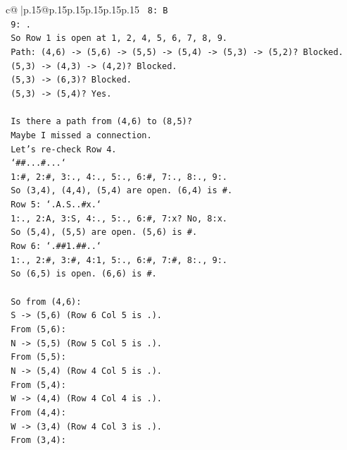 \documentclass{article}
\begin{document}
{\begin{supertabular}{c@{$\;$}|p{.15\linewidth}@{}p{.15\linewidth}p{.15\linewidth}p{.15\linewidth}p{.15\linewidth}p{.15\linewidth}}
{{{\texttt{   8: B} \\
\texttt{   9: .} \\
\texttt{   So Row 1 is open at 1, 2, 4, 5, 6, 7, 8, 9.} \\
\texttt{   Path: (4,6) {-}> (5,6) {-}> (5,5) {-}> (5,4) {-}> (5,3) {-}> (5,2)? Blocked.} \\
\texttt{   (5,3) {-}> (4,3) {-}> (4,2)? Blocked.} \\
\texttt{   (5,3) {-}> (6,3)? Blocked.} \\
\texttt{   (5,3) {-}> (5,4)? Yes.} \\
\\ 
\texttt{   Is there a path from (4,6) to (8,5)?} \\
\texttt{   Maybe I missed a connection.} \\
\texttt{   Let's re{-}check Row 4.} \\
\texttt{   `\#\#...\#...`} \\
\texttt{   1:\#, 2:\#, 3:., 4:., 5:., 6:\#, 7:., 8:., 9:.} \\
\texttt{   So (3,4), (4,4), (5,4) are open. (6,4) is \#.} \\
\texttt{   Row 5: `.A.S..\#x.`} \\
\texttt{   1:., 2:A, 3:S, 4:., 5:., 6:\#, 7:x? No, 8:x.} \\
\texttt{   So (5,4), (5,5) are open. (5,6) is \#.} \\
\texttt{   Row 6: `.\#\#1.\#\#..`} \\
\texttt{   1:., 2:\#, 3:\#, 4:1, 5:., 6:\#, 7:\#, 8:., 9:.} \\
\texttt{   So (6,5) is open. (6,6) is \#.} \\
\\ 
\texttt{   So from (4,6):} \\
\texttt{   S {-}> (5,6) (Row 6 Col 5 is .).} \\
\texttt{   From (5,6):} \\
\texttt{   N {-}> (5,5) (Row 5 Col 5 is .).} \\
\texttt{   From (5,5):} \\
\texttt{   N {-}> (5,4) (Row 4 Col 5 is .).} \\
\texttt{   From (5,4):} \\
\texttt{   W {-}> (4,4) (Row 4 Col 4 is .).} \\
\texttt{   From (4,4):} \\
\texttt{   W {-}> (3,4) (Row 4 Col 3 is .).} \\
\texttt{   From (3,4):} \\
}}}
\end{supertabular}}
\end{document}
